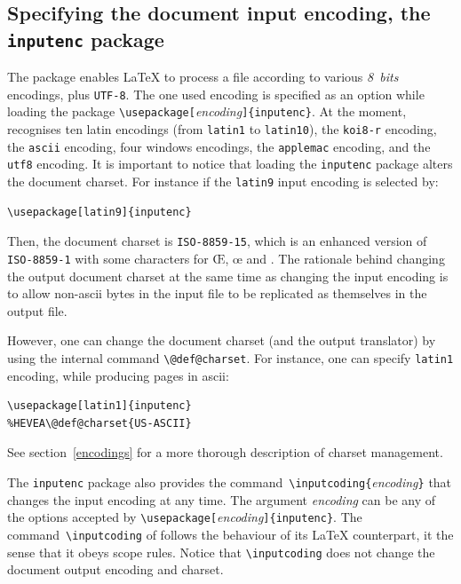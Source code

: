 \subsection{Specifying \label{inputenc}the document input encoding, the \texttt{inputenc} package}
%
The 
package enables \LaTeX{} to process a file
according to various \emph{8~bits} encodings, plus \texttt{UTF-8}.
The one used encoding is specified as an option while loading the package
\verb+\usepackage[+\textit{encoding}\verb+]{inputenc}+.
At the moment, \hevea{} recognises ten latin encodings
(from \texttt{latin1} to \texttt{latin10}),
the \texttt{koi8-r} encoding,
the \texttt{ascii} encoding,
four windows encodings, the \texttt{applemac} encoding, and the
\texttt{utf8} encoding.
It is important to notice that loading the \verb+inputenc+ package
alters the \html{} document charset.
For instance if the \texttt{latin9} input encoding is selected by:
\begin{verbatim}
\usepackage[latin9]{inputenc}
\end{verbatim}
Then, the document charset is \verb+ISO-8859-15+, which is an
enhanced version of \verb+ISO-8859-1+ with some characters
for \OE, \oe{} and \texteuro.
The rationale behind changing the output document charset at the same
time as changing the input encoding is to allow
non-ascii bytes in the input file to be replicated as
themselves in the output file.

However, one can change the document charset (and the output
translator) by using the internal command \verb+\@def@charset+.
For instance, one can specify \texttt{latin1} encoding, while
producing \html{} pages in ascii:
\begin{verbatim}
\usepackage[latin1]{inputenc}
%HEVEA\@def@charset{US-ASCII}
\end{verbatim}
See section~\ref{encodings} for a more thorough description of \html{}
charset management.

The \texttt{inputenc} package also provides the
command~\verb+\inputcoding{+\textit{encoding}\verb+}+ that
changes the input encoding at any time.
The argument \textit{encoding} can be any of the options accepted
by \verb+\usepackage[+\textit{encoding}\verb+]{inputenc}+.
The command~\verb+\inputcoding+ of \hevea{}
follows the behaviour of its \LaTeX{} counterpart, it the sense
that it obeys scope rules.
Notice that \verb+\inputcoding+ does not change the document output
encoding and charset.

